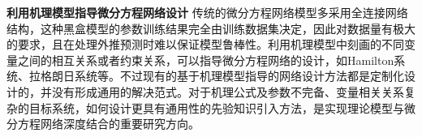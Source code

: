 \textbf{利用机理模型指导微分方程网络设计}
传统的微分方程网络模型多采用全连接网络结构，这种黑盒模型的参数训练结果完全由训练数据集决定，因此对数据量有极大的要求，且在处理外推预测时难以保证模型鲁棒性。利用机理模型中刻画的不同变量之间的相互关系或者约束关系，可以指导微分方程网络的设计，如Hamilton系统、拉格朗日系统等。不过现有的基于机理模型指导的网络设计方法都是定制化设计的，并没有形成通用的解决范式。对于机理公式及参数不完备、变量相关关系复杂的目标系统，如何设计更具有通用性的先验知识引入方法，是实现理论模型与微分方程网络深度结合的重要研究方向。

